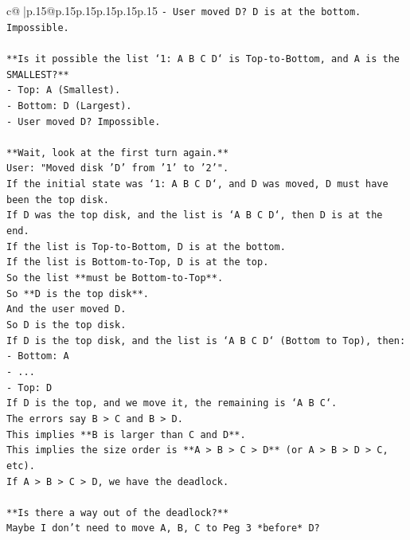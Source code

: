 \documentclass{article}
\begin{document}
{\begin{supertabular}{c@{$\;$}|p{.15\linewidth}@{}p{.15\linewidth}p{.15\linewidth}p{.15\linewidth}p{.15\linewidth}p{.15\linewidth}}
{{{\texttt{{-} User moved D? D is at the bottom. Impossible.} \\
\\ 
\texttt{**Is it possible the list `1: A B C D` is Top{-}to{-}Bottom, and A is the SMALLEST?**} \\
\texttt{{-} Top: A (Smallest).} \\
\texttt{{-} Bottom: D (Largest).} \\
\texttt{{-} User moved D? Impossible.} \\
\\ 
\texttt{**Wait, look at the first turn again.**} \\
\texttt{User: "Moved disk 'D' from '1' to '2'".} \\
\texttt{If the initial state was `1: A B C D`, and D was moved, D must have been the top disk.} \\
\texttt{If D was the top disk, and the list is `A B C D`, then D is at the end.} \\
\texttt{If the list is Top{-}to{-}Bottom, D is at the bottom.} \\
\texttt{If the list is Bottom{-}to{-}Top, D is at the top.} \\
\texttt{So the list **must be Bottom{-}to{-}Top**.} \\
\texttt{So **D is the top disk**.} \\
\texttt{And the user moved D.} \\
\texttt{So D is the top disk.} \\
\texttt{If D is the top disk, and the list is `A B C D` (Bottom to Top), then:} \\
\texttt{{-} Bottom: A} \\
\texttt{{-} ...} \\
\texttt{{-} Top: D} \\
\texttt{If D is the top, and we move it, the remaining is `A B C`.} \\
\texttt{The errors say B > C and B > D.} \\
\texttt{This implies **B is larger than C and D**.} \\
\texttt{This implies the size order is **A > B > C > D** (or A > B > D > C, etc).} \\
\texttt{If A > B > C > D, we have the deadlock.} \\
\\ 
\texttt{**Is there a way out of the deadlock?**} \\
\texttt{Maybe I don't need to move A, B, C to Peg 3 *before* D?} \\
}}}
\end{supertabular}}
\end{document}
